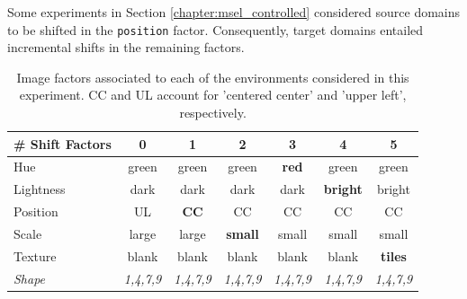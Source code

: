 \begin{dataset} Some experiments in Section \ref{chapter:msel_controlled}
    considered source domains to be shifted in the \texttt{position} factor. Consequently, target
    domains entailed incremental shifts in the remaining factors.

    \begin{table}[H]
        \centering
        \begin{tabular}{l|c|c|c|c|c|c}
         \# Shift Factors  & 0 & 1 & 2 & 3 & 4 & 5 \\
        \midrule
        Hue & green & green & green & \textbf{red} & green & green \\
        Lightness & dark & dark & dark & dark & \textbf{bright} & bright \\
        Position  & UL & \textbf{CC} & CC & CC & CC & CC \\
        Scale  & large & large & \textbf{small} & small & small & small\\
        Texture & blank & blank & blank & blank & blank & \textbf{tiles} \\
        \textit{Shape} & \textit{1,4,7,9} &  \textit{1,4,7,9} &  \textit{1,4,7,9} & \textit{1,4,7,9} & \textit{1,4,7,9} & \textit{1,4,7,9}\\
        \bottomrule
        \end{tabular}
        \caption{
        Image factors associated to each of the environments considered in this experiment. CC and UL account
        for 'centered center' and 'upper left', respectively.
        }
        \label{ds:pos_test}
    \end{table}
\end{dataset}


